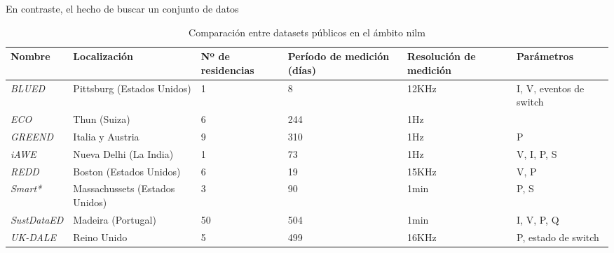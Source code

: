 \vspace{3mm}



\vspace{3mm}




En contraste, el hecho de buscar un conjunto de datos 











\begin{sidewaystable}
    \centering 
    \begin{tabularx}{\textheight}{|X|X|X|X|X|X|}
        \hline
        \rowcolor[HTML]{EFEFEF} 
        Nombre & Localización & Nº de residencias & Período de medición (días) & Resolución de medición & Parámetros \\ \hline
        \textit{BLUED} \cite{blued} & Pittsburg (Estados Unidos) & 1 & 8 & 12KHz &  I, V, eventos de switch \\ \hline
        \textit{ECO} \cite{eco} & Thun (Suiza) & 6 & 244 & 1Hz &  \\ \hline
        \textit{GREEND} \cite{greend} & Italia y Austria & 9 & 310 & 1Hz & P \\ \hline
        \textit{iAWE} \cite{iawe} & Nueva Delhi (La India) & 1 & 73 & 1Hz & V, I, P, S \\ \hline
        \textit{REDD} \cite{redd} & Boston (Estados Unidos) & 6 & 19 & 15KHz & V, P \\ \hline
        \textit{Smart*} \cite{smart*} & Massachussets (Estados Unidos) & 3 & 90 & 1min & P, S \\ \hline
        \textit{SustDataED} \cite{sustdata} & Madeira (Portugal) & 50 & 504 & 1min & I, V, P, Q \\ \hline
        \textit{UK-DALE} \cite{ukdale} & Reino Unido & 5 & 499 & 16KHz & P, estado de switch \\ \hline
    \end{tabularx}
    \caption{Comparación entre datasets públicos en el ámbito \acrshort{nilm} \cite{greend} \cite{intrusive} \cite{tabladatasets}}
    \label{tab:datasets}
\end{sidewaystable}
















